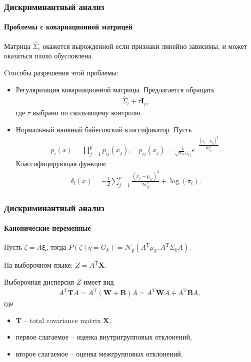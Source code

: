 \documentclass{beamer}
\begin{document}
\begin{frame}
  \frametitle{Дискриминантный анализ}
  \framesubtitle{Проблемы с ковариационной матрицей}
  Матрица $\widehat{\Sigma}_i$  окажется вырожденной если признаки линейно зависимы, и может оказаться плохо обусловлена.

  Cпособы разрешения этой проблемы:
  \begin{itemize}
    \item Регуляризация ковариационной матрицы. Предлагается обращать
    \begin{align*}
       \widehat{\Sigma}_i + \tau \mathbf{I}_p,
    \end{align*}
     где $\tau$ выбрано по скользящему контролю.
    \item Нормальный наивный байесовский классификатор. Пусть
    \begin{align*}
      p_i(x) = \prod_{j = 1}^p p_{ij}(x_j), \quad p_{ij}(x_j) = \frac{1}{\sqrt{2\pi}\sigma_{ij}}e^{-\frac{(x_j - \mu_{ij})^2}{2\sigma^2_{ij}}}.
    \end{align*}
    Классифицирующая функция:
    \begin{align*}
      \delta_i(x) = -\frac{1}{2}\sum_{j = 1}^p\frac{(x_j - \mu_{ij})^2}{2\sigma^2_{ij}} + \log(\pi_i).
    \end{align*}
  \end{itemize}
\end{frame}
\begin{frame}
\frametitle{Дискриминантный анализ}
\framesubtitle{Канонические переменные}
Пусть $\zeta = A\boldsymbol{\xi}$, тогда $P(\zeta \mid \eta = G_k) = \mathcal{N}_p(A^\mathrm{T}\mu_k, A^\mathrm{T}\Sigma_kA)$.

На выборочном языке: $Z =A^\mathrm{T}\mathbf{X}$.

Выборочная дисперсия $Z$ имеет вид
\begin{align*}
A^\mathrm{T}\mathbf{T}A = A^\mathrm{T}(\mathbf{W} + \mathbf{B})A = A^\mathrm{T}\mathbf{W}A + A^\mathrm{T}\mathbf{B}A,
\end{align*}
где
\begin{itemize}
  \item $\mathbf{T}$ -- total covariance matrix $\mathbf{X}$,
  \item первое слагаемое -- оценка внутригрупповых отклонений,
  \item второе слагаемое -- оценка межгрупповых отклонений.
\end{itemize}
\end{frame}
\end{document}
